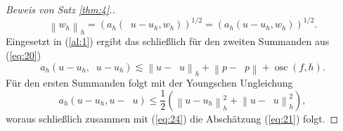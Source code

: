 \documentclass[a4paper]{scrartcl}
\newcommand{\norm}[1]{\left\lVert#1\right\rVert}
\newcommand{\hnorm}[1]{\left\lVert#1\right\rVert_h}
\DeclareMathOperator{\intOp}{I_{NC}}
\DeclareMathOperator{\LtwoOp}{\Pi_0}
\DeclareMathOperator{\osc}{osc}
\theoremstyle{plain}
\theoremstyle{definition}
\theoremstyle{remark}
\begin{document}
\begin{proof}[Beweis von Satz \ref{thm:4}.]
  \begin{equation}
    \label{eq:23}
    \hnorm{w_h} = (a_h(\intOp u - u_h, w_h))^{1/2} = (a_h( u - u_h, w_h))^{1/2}.
  \end{equation}
  Eingesetzt in (\ref{al:1}) ergibt das schließlich für den zweiten
  Summanden aus (\ref{eq:20})
  \begin{equation}
    \label{eq:24}
    a_h(u - u_h, \intOp u - u_h) \lesssim \hnorm{u - \intOp u} + \norm{p - \LtwoOp p} + \osc(f, h). 
  \end{equation}
  Für den ersten Summanden folgt mit der Youngschen Ungleichung
  \begin{equation}
    \label{eq:25}
    a_h(u - u_h, u - \intOp u) \leq \frac{1}{2}\left(\hnorm{u - u_h}^2 + \hnorm{u - \intOp u}^2 \right), 
  \end{equation}
  woraus schließlich zusammen mit (\ref{eq:24}) die Abschätzung
  (\ref{eq:21}) folgt. 


\end{proof}
\end{document}
